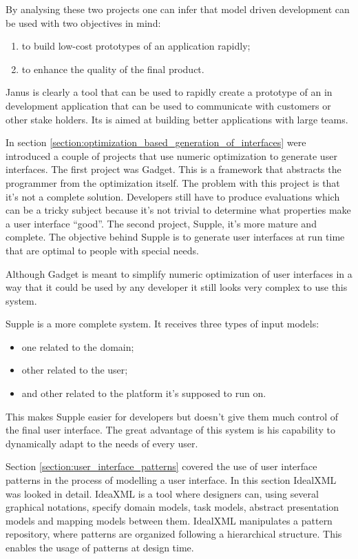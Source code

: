 By analysing these two projects one can infer that model driven development can be used with two objectives in mind:
\begin{enumerate}
\item to build low-cost prototypes of an application rapidly;
\item to enhance the quality of the final product.
\end{enumerate}

Janus is clearly a tool that can be used to rapidly create a prototype of an in development application that can be used to communicate with customers or other stake holders. Its is aimed at building better applications with large teams.

In section \ref{section:optimization_based_generation_of_interfaces} were introduced a couple of projects that use numeric optimization to generate user interfaces. The first project was Gadget\cite{gadget}. This is a framework that abstracts the programmer from the optimization itself. The problem with this project is that it's not a complete solution. Developers still have to produce evaluations which can be a tricky subject because it's not trivial to determine what properties make a user interface  ``good''. The second project, Supple\cite{supple}, it's more mature and complete. The objective behind Supple is to generate user interfaces at run time that are optimal to people with special needs.

Although Gadget is meant to simplify numeric optimization of user interfaces in a way that it could be used by any developer it still looks very complex to use this system.

Supple is a more complete system. It receives three types of input models:
\begin{itemize}
\item one related to the domain;
\item other related to the user;
\item and other related to the platform it's supposed to run on.
\end{itemize}

This makes Supple easier for developers but doesn't give them much control of the final user interface. The great advantage of this system is his capability to dynamically adapt to the needs of every user.

Section \ref{section:user_interface_patterns} covered the use of user interface patterns in the process of modelling a user interface. In this section IdealXML\cite{IdealXml_An_Interaction_Design_Tool, idealxml2} was looked in detail. IdeaXML is a tool where designers can, using several graphical notations, specify domain models, task models, abstract presentation models and mapping models between them. IdealXML manipulates a pattern repository, where patterns are organized following a hierarchical structure. This enables the usage of patterns at design time.

